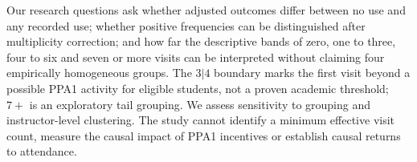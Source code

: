 \documentclass[namedate,webpdf,imaiai]{ima-authoring-template}
\begin{document}
Our research questions ask whether adjusted outcomes differ between no use and any recorded use; whether positive frequencies can be distinguished after multiplicity correction; and how far the descriptive bands of zero, one to three, four to six and seven or more visits can be interpreted without claiming four empirically homogeneous groups. The $3|4$ boundary marks the first visit beyond a possible PPA1 activity for eligible students, not a proven academic threshold; $7+$ is an exploratory tail grouping. We assess sensitivity to grouping and instructor-level clustering. The study cannot identify a minimum effective visit count, measure the causal impact of PPA1 incentives or establish causal returns to attendance.
\end{document}
